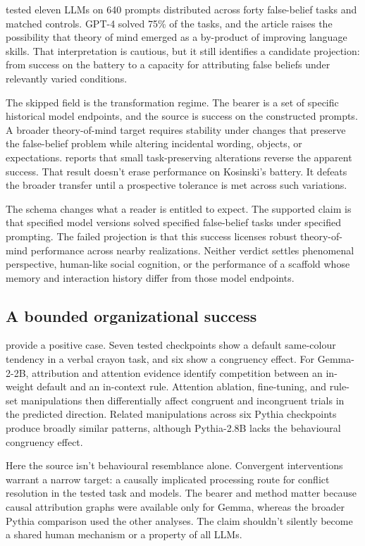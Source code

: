 \documentclass[12pt]{article}
\begin{document}
\textcite{kosinski2024} tested eleven LLMs on 640 prompts distributed across forty false-belief tasks and matched controls. GPT-4 solved 75\% of the tasks, and the article raises the possibility that theory of mind emerged as a by-product of improving language skills. That interpretation is cautious, but it still identifies a candidate projection: from success on the battery to a capacity for attributing false beliefs under relevantly varied conditions.

The skipped field is the transformation regime. The bearer is a set of specific historical model endpoints, and the source is success on the constructed prompts. A broader theory-of-mind target requires stability under changes that preserve the false-belief problem while altering incidental wording, objects, or expectations. \textcite{ullman2023Trivial} reports that small task-preserving alterations reverse the apparent success. That result doesn't erase performance on Kosinski's battery. It defeats the broader transfer until a prospective tolerance is met across such variations.

The schema changes what a reader is entitled to expect. The supported claim is that specified model versions solved specified false-belief tasks under specified prompting. The failed projection is that this success licenses robust theory-of-mind performance across nearby realizations. Neither verdict settles phenomenal perspective, human-like social cognition, or the performance of a scaffold whose memory and interaction history differ from those model endpoints.

\subsection{A bounded organizational success}

\textcite{hu2026ConflictCongruency} provide a positive case. Seven tested checkpoints show a default same-colour tendency in a verbal crayon task, and six show a congruency effect. For Gemma-2-2B, attribution and attention evidence identify competition between an in-weight default and an in-context rule. Attention ablation, fine-tuning, and rule-set manipulations then differentially affect congruent and incongruent trials in the predicted direction. Related manipulations across six Pythia checkpoints produce broadly similar patterns, although Pythia-2.8B lacks the behavioural congruency effect.

Here the source isn't behavioural resemblance alone. Convergent interventions warrant a narrow target: a causally implicated processing route for conflict resolution in the tested task and models. The bearer and method matter because causal attribution graphs were available only for Gemma, whereas the broader Pythia comparison used the other analyses. The claim shouldn't silently become a shared human mechanism or a property of all LLMs.
\end{document}
